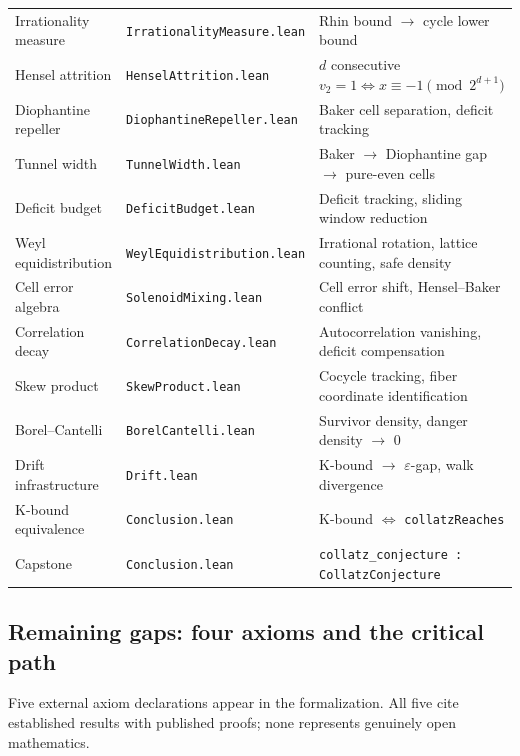 \documentclass[manuscript]{aomart}
\theoremstyle{plain}
\theoremstyle{definition}
\theoremstyle{remark}
\numberwithin{equation}{section}
\begin{document}
\begin{center}
\begin{tabular}{lll}
  Irrationality measure & \texttt{IrrationalityMeasure.lean} &
    Rhin bound $\to$ cycle lower bound \\
  Hensel attrition & \texttt{HenselAttrition.lean} &
    $d$ consecutive $v_2 = 1 \Leftrightarrow x \equiv -1 \pmod{2^{d+1}}$ \\
  Diophantine repeller & \texttt{DiophantineRepeller.lean} &
    Baker cell separation, deficit tracking \\
  Tunnel width & \texttt{TunnelWidth.lean} &
    Baker $\to$ Diophantine gap $\to$ pure-even cells \\
  Deficit budget & \texttt{DeficitBudget.lean} &
    Deficit tracking, sliding window reduction \\
  Weyl equidistribution & \texttt{WeylEquidistribution.lean} &
    Irrational rotation, lattice counting, safe density \\
  Cell error algebra & \texttt{SolenoidMixing.lean} &
    Cell error shift, Hensel--Baker conflict \\
  Correlation decay & \texttt{CorrelationDecay.lean} &
    Autocorrelation vanishing, deficit compensation \\
  Skew product & \texttt{SkewProduct.lean} &
    Cocycle tracking, fiber coordinate identification \\
  Borel--Cantelli & \texttt{BorelCantelli.lean} &
    Survivor density, danger density $\to$ 0 \\
  Drift infrastructure & \texttt{Drift.lean} &
    K-bound $\to$ $\varepsilon$-gap, walk divergence \\
  K-bound equivalence & \texttt{Conclusion.lean} &
    K-bound $\Leftrightarrow$ \texttt{collatzReaches} \\
  Capstone & \texttt{Conclusion.lean} &
    \texttt{collatz\_conjecture : CollatzConjecture} \\
  \bottomrule
\end{tabular}
\end{center}

\subsection{Remaining gaps: four axioms and the critical path}

Five external axiom declarations appear in the formalization.  All five
cite established results with published proofs; none represents
genuinely open mathematics.
\end{document}
